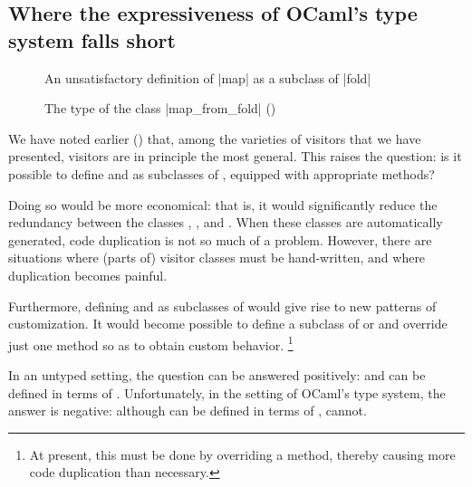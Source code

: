 \documentclass[11pt,a4paper,twoside]{article}
\begin{document}

\subsection{Where the expressiveness of OCaml's type system falls short}
\label{sec:map_from_fold}

\begin{figure}[p]
\caption{An unsatisfactory definition of \oc|map| as a subclass of \oc|fold|}
\label{fig:map_from_fold}
\end{figure}

\begin{figure}[p]
\begin{mdframed}[backgroundcolor=green!10]

\end{mdframed}
\caption{The type of the class \oc|map_from_fold| ()}
\label{fig:map_from_fold:type}
\end{figure}

We have noted earlier () that, among the varieties of
visitors that we have presented, \fold visitors are in principle the most
general. This raises the question: is it possible to define \map and \reduce
as subclasses of \fold, equipped with appropriate \tyconascendingmethod{}
methods?

Doing so would be more economical: that is, it would significantly reduce the
redundancy between the classes \map, \reduce, and \fold. When these classes
are automatically generated, code duplication is not so much of a problem.
However, there are situations where (parts of) visitor classes must be
hand-written, and where duplication becomes painful.

Furthermore, defining \map and \reduce as subclasses of \fold would give rise
to new patterns of customization. It would become possible to define a
subclass of \map or \reduce and override just one \tyconascendingmethod{}
method so as to obtain custom behavior.%
%
\footnote{At present, this must be done by overriding a
  \tyconvisitor{} method, thereby causing more code duplication than
  necessary.}

In an untyped setting, the question can be answered positively: \map and
\reduce can be defined in terms of \fold. Unfortunately, in the setting
of OCaml's type system, the answer is negative: although \reduce can be
defined in terms of \fold, \map cannot.
\end{document}
